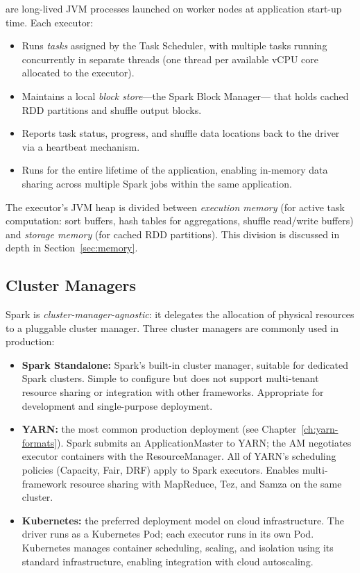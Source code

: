  are long-lived JVM processes launched on worker nodes
at application start-up time. Each executor:
\begin{itemize}
  \item Runs \emph{tasks} assigned by the Task Scheduler, with multiple
        tasks running concurrently in separate threads (one thread per
        available vCPU core allocated to the executor).
  \item Maintains a local \emph{block store}---the Spark Block Manager---
        that holds cached RDD partitions and shuffle output blocks.
  \item Reports task status, progress, and shuffle data locations back
        to the driver via a heartbeat mechanism.
  \item Runs for the entire lifetime of the application, enabling in-memory
        data sharing across multiple Spark jobs within the same application.
\end{itemize}

The executor's JVM heap is divided between \emph{execution memory}
(for active task computation: sort buffers, hash tables for aggregations,
shuffle read/write buffers) and \emph{storage memory} (for cached
RDD partitions). This division is discussed in depth in
Section~\ref{sec:memory}.

\subsection{Cluster Managers}
\label{subsec:cluster-managers}

Spark is \emph{cluster-manager-agnostic}: it delegates the allocation
of physical resources to a pluggable cluster manager. Three cluster
managers are commonly used in production:

\begin{itemize}
  \item \textbf{Spark Standalone:} Spark's built-in cluster manager,
        suitable for dedicated Spark clusters. Simple to configure but
        does not support multi-tenant resource sharing or integration
        with other frameworks. Appropriate for development and
        single-purpose deployment.
  \item \textbf{YARN:} the most common production deployment (see
        Chapter~\ref{ch:yarn-formats}). Spark submits an
        ApplicationMaster to YARN; the AM negotiates executor containers
        with the ResourceManager. All of YARN's scheduling policies
        (Capacity, Fair, DRF) apply to Spark executors. Enables
        multi-framework resource sharing with MapReduce, Tez, and Samza
        on the same cluster.
  \item \textbf{Kubernetes:} the preferred deployment model on
        cloud infrastructure. The driver runs as a Kubernetes Pod; each
        executor runs in its own Pod. Kubernetes manages container
        scheduling, scaling, and isolation using its standard
        infrastructure, enabling integration with cloud autoscaling.
\end{itemize}

